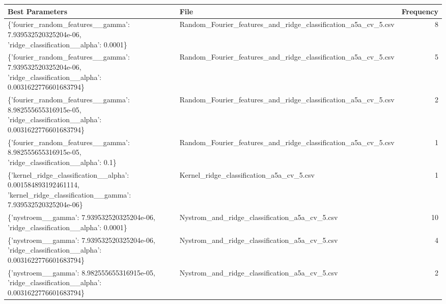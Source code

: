 \begin{tabularx}{\textwidth}{llr}
\toprule
                                                                                                          Best Parameters &                                                          File &  Frequency \\
\midrule
                         \{'fourier\_random\_features\_\_gamma': 7.939532520325204e-06, 'ridge\_classification\_\_alpha': 0.0001\} & Random\_Fourier\_features\_and\_ridge\_classification\_a5a\_cv\_5.csv &          8 \\
          \{'fourier\_random\_features\_\_gamma': 7.939532520325204e-06, 'ridge\_classification\_\_alpha': 0.0031622776601683794\} & Random\_Fourier\_features\_and\_ridge\_classification\_a5a\_cv\_5.csv &          5 \\
          \{'fourier\_random\_features\_\_gamma': 8.982555655316915e-05, 'ridge\_classification\_\_alpha': 0.0031622776601683794\} & Random\_Fourier\_features\_and\_ridge\_classification\_a5a\_cv\_5.csv &          2 \\
                            \{'fourier\_random\_features\_\_gamma': 8.982555655316915e-05, 'ridge\_classification\_\_alpha': 0.1\} & Random\_Fourier\_features\_and\_ridge\_classification\_a5a\_cv\_5.csv &          1 \\
\{'kernel\_ridge\_classification\_\_alpha': 0.001584893192461114, 'kernel\_ridge\_classification\_\_gamma': 7.939532520325204e-06\} &                      Kernel\_ridge\_classification\_a5a\_cv\_5.csv &          1 \\
                                        \{'nystroem\_\_gamma': 7.939532520325204e-06, 'ridge\_classification\_\_alpha': 0.0001\} &                 Nystrom\_and\_ridge\_classification\_a5a\_cv\_5.csv &         10 \\
                         \{'nystroem\_\_gamma': 7.939532520325204e-06, 'ridge\_classification\_\_alpha': 0.0031622776601683794\} &                 Nystrom\_and\_ridge\_classification\_a5a\_cv\_5.csv &          4 \\
                         \{'nystroem\_\_gamma': 8.982555655316915e-05, 'ridge\_classification\_\_alpha': 0.0031622776601683794\} &                 Nystrom\_and\_ridge\_classification\_a5a\_cv\_5.csv &          2 \\
\bottomrule
\end{tabularx}
